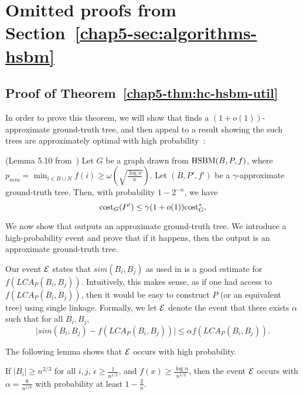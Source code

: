 \section{Omitted proofs from Section~\ref{chap5-sec:algorithms-hsbm}}

\subsection{Proof of Theorem~\ref{chap5-thm:hc-hsbm-util}}\label{chap5-sec:hc-hsbm-util}

In order to prove this theorem, we will show that \dphcblocks{} finds a $(1+o(1))$-approximate ground-truth tree, and then appeal to a result showing the such trees are approximately optimal with high probability~\citep{cohen2019hierarchical}:

\begin{lem}\label{chap5-lem:approx-hsbm-tree-opt} (Lemma 5.10 from~\citet{cohen2019hierarchical})
Let $G$ be a graph drawn from $\textnormal{HSBM}(B,P,f)$,  where $p_{min} = \min_{i \in B \cup N} f(i) \geq \omega(\sqrt{\frac{\log n}{n}})$. Let $(B,P',f')$ be a $\gamma$-approximate ground-truth tree. Then, with probability $1-2^{-n}$, we have
\[
    \textnormal{cost}_G(P') \leq \gamma (1 + o(1)) \textnormal{cost}_G^*,
\]
\end{lem}

We now show that \dphcblocks{} outputs an approximate ground-truth tree.
We introduce a high-probability event and prove that if it happens, then the output is an approximate ground-truth tree.

Our event $\mathcal{E}$ states that $sim(B_i, B_j)$ as used in \dphcblocks{} is a good estimate for $f(LCA_P(B_i, B_j))$. Intuitively, this makes sense, as if one had access to $f(LCA_P(B_i, B_j))$, then it would be easy to construct $P$ (or an equivalent tree) using single linkage. Formally, we let $\mathcal{E}$ denote the event that there exists $\alpha$ such that for all $B_i, B_j$,
\begin{equation}\label{chap5-eq:good-event}
    \big|sim(B_i, B_j) - f(LCA_P(B_i, B_j))\big| \leq \alpha f(LCA_P(B_i, B_j)).
\end{equation}

The following lemma shows that $\mathcal{E}$ occurs with high probability.
\begin{lem}\label{chap5-lem:good-event}
If $|B_i| \geq n^{2/3}$ for all $i, j$, $\epsilon \geq \frac{1}{n^{1/2}}$, and $f(x) \geq \frac{\log n}{n^{1/2}}$, then the event $\mathcal{E}$ occurs with $\alpha = \frac{8}{n^{1/6}}$ with probability at least $1-\frac{2}{n}$.
\end{lem}

